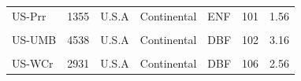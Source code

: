 \begin{table}[!h]
\begin{tabular}[t]{lrlllrr}
\addlinespace
US-Prr & 1355 & U.S.A & Continental & ENF & 101 & 1.56\\
\cellcolor{gray!10}{US-Syv} & \cellcolor{gray!10}{2723} & \cellcolor{gray!10}{U.S.A} & \cellcolor{gray!10}{Continental} & \cellcolor{gray!10}{MF} & \cellcolor{gray!10}{307} & \cellcolor{gray!10}{2.52}\\
US-UMB & 4538 & U.S.A & Continental & DBF & 102 & 3.16\\
\cellcolor{gray!10}{US-UMd***} & \cellcolor{gray!10}{2715} & \cellcolor{gray!10}{U.S.A} & \cellcolor{gray!10}{Continental} & \cellcolor{gray!10}{DBF} & \cellcolor{gray!10}{94} & \cellcolor{gray!10}{2.91}\\
US-WCr & 2931 & U.S.A & Continental & DBF & 106 & 2.56\\
\bottomrule
\end{tabular}
\end{table}